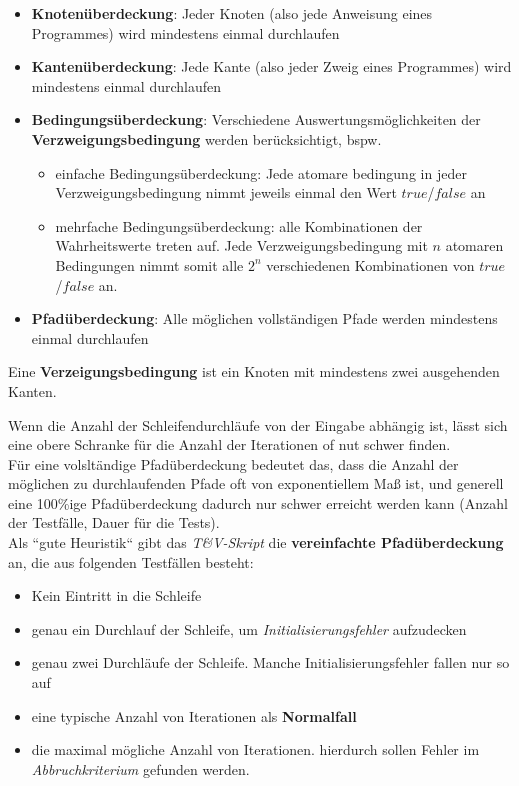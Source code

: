 \begin{itemize}
    \item \textbf{Knotenüberdeckung}: Jeder Knoten (also jede Anweisung eines Programmes) wird mindestens einmal durchlaufen
    \item \textbf{Kantenüberdeckung}: Jede Kante (also jeder Zweig eines Programmes) wird mindestens einmal durchlaufen
    \item \textbf{Bedingungsüberdeckung}: Verschiedene Auswertungsmöglichkeiten der \textbf{Verzweigungsbedingung} werden berücksichtigt, bspw.
    \begin{itemize}
        \item einfache Bedingungsüberdeckung: Jede atomare bedingung in jeder Verzweigungsbedingung nimmt jeweils einmal den Wert $true$/$false$ an
        \item mehrfache Bedingungsüberdeckung: alle Kombinationen der Wahrheitswerte treten auf. Jede Verzweigungsbedingung mit $n$ atomaren Bedingungen nimmt somit alle $2^n$ verschiedenen Kombinationen von $true$/$false$ an.
    \end{itemize}
    \item \textbf{Pfadüberdeckung}: Alle möglichen vollständigen Pfade werden mindestens einmal durchlaufen
\end{itemize}

\vspace{5mm}
\begin{tcolorbox}[title={Verzweigungsbedingung}]
    Eine \textbf{Verzeigungsbedingung} ist ein Knoten mit mindestens zwei ausgehenden Kanten.
\end{tcolorbox}
\vspace{5mm}

\noindent
Wenn die Anzahl der Schleifendurchläufe von der Eingabe abhängig ist, lässt sich eine obere Schranke für die Anzahl der Iterationen of nut schwer finden.\\
Für eine volsltändige Pfadüberdeckung bedeutet das, dass die Anzahl der möglichen zu durchlaufenden Pfade oft von exponentiellem Maß ist, und generell eine 100\%ige Pfadüberdeckung dadurch nur schwer erreicht werden kann (Anzahl der Testfälle, Dauer für die Tests).\\
Als ``gute Heuristik`` gibt das \textit{T\&V-Skript} die \textbf{vereinfachte Pfadüberdeckung} an, die aus folgenden Testfällen besteht:

\begin{itemize}
    \item Kein Eintritt in die Schleife
    \item genau ein Durchlauf der Schleife, um \textit{Initialisierungsfehler} aufzudecken
    \item genau zwei Durchläufe der Schleife. Manche Initialisierungsfehler fallen nur so auf
    \item eine typische Anzahl von Iterationen als \textbf{Normalfall}
    \item die maximal mögliche Anzahl von Iterationen. hierdurch sollen Fehler im \textit{Abbruchkriterium} gefunden werden.
\end{itemize}